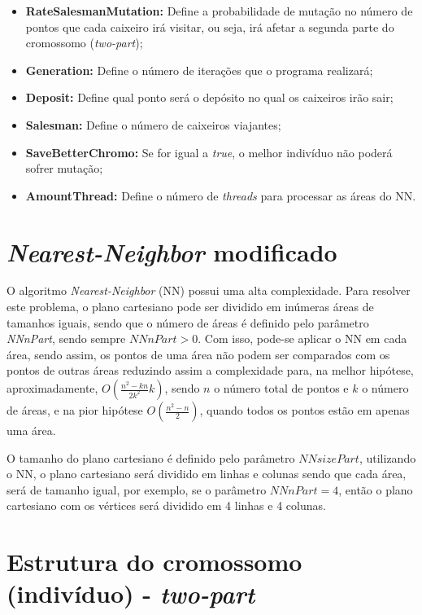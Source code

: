 \documentclass[12pt,openright,a4paper,twoside]{tcc}
\begin{document}
\begin{itemize}
                \item \textbf{RateSalesmanMutation:} Define a probabilidade de mutação no número de pontos que cada caixeiro irá visitar, ou seja, irá afetar a segunda parte do cromossomo (\textit{two-part});
                \item \textbf{Generation:} Define o número de iterações que o programa realizará;
                \item \textbf{Deposit:} Define qual ponto será o depósito no qual os caixeiros irão sair;
                \item \textbf{Salesman:} Define o número de caixeiros viajantes;
                \item \textbf{SaveBetterChromo:} Se for igual a \textit{true}, o melhor indivíduo não poderá sofrer mutação;
                \item \textbf{AmountThread:} Define o número de \textit{threads} para processar as áreas do NN.
            \end{itemize}   

		\section {\textit{Nearest-Neighbor} modificado}
            \label{NNMod}
		O algoritmo \textit{Nearest-Neighbor} (NN) possui uma alta complexidade. Para resolver este problema, o plano cartesiano pode ser dividido em inúmeras áreas de tamanhos iguais, sendo que o número de áreas é definido pelo parâmetro \textit{NNnPart}, sendo sempre $NNnPart > 0$. 
		Com isso, pode-se aplicar o NN em cada área, sendo assim, os pontos de uma área não podem ser comparados com os pontos de outras áreas reduzindo assim a complexidade para, na melhor hipótese, aproximadamente, $O(\frac{n^2-kn}{2k^2}k)$, sendo $n$ o número total de pontos e $k$ o número de áreas, e na pior hipótese $O(\frac{n^2-n}{2})$, quando todos os pontos estão em apenas uma área. 
		
		O tamanho do plano cartesiano é definido pelo parâmetro $NNsizePart$, utilizando o NN, o plano cartesiano será dividido em linhas e colunas sendo que cada área, será de tamanho igual, por exemplo, se o parâmetro $NNnPart = 4$, então o plano cartesiano com os vértices será dividido em 4 linhas e 4 colunas.  
		
		
		\section{Estrutura do cromossomo (indivíduo) - \textit{two-part}}
		
\end{document}
